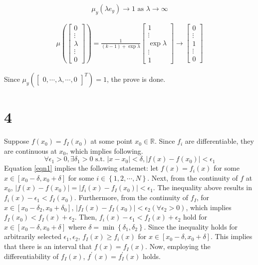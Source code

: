 \documentclass[10pt]{article}
\begin{document}
\begin{equation*}
    \mu_y(\lambda e_y) \rightarrow 1 \text{ as } \lambda \rightarrow \infty
\end{equation*}

\begin{align*}
    \mu\left(\begin{bmatrix}
        0  \\ \vdots \\ \lambda \\ \vdots \\ 0 
    \end{bmatrix}\right) = \frac{1}{(k-1) + \exp{\lambda}}\begin{bmatrix}
        1  \\ \vdots \\ \exp{\lambda} \\ \vdots \\ 1 
    \end{bmatrix} \rightarrow \begin{bmatrix}
        0  \\ \vdots \\ 1 \\ \vdots \\ 0
    \end{bmatrix}
\end{align*}

Since $\mu_y(\begin{bmatrix}
    0  ,\cdots,  \lambda,  \cdots,  0
\end{bmatrix}^T) = 1$, the prove is done.

\section*{4}
Suppose $f(x_0) = f_I(x_0)$ at some point $x_0 \in \mathbb{R}$. Since $f_i$ are differentiable, they are continuous at $x_0$, which implies following.
\begin{equation}
    \forall \epsilon_1>0, \exists \delta_1>0 \text{ s.t. } |x-x_0| < \delta, |f(x) - f(x_0)| <\epsilon_1
    \label{eqn1}
\end{equation}
Equation \ref{eqn1} implies the following statemet: let $f(x)=f_i(x)$ for some $x \in [x_0-\delta,x_0+\delta]$ for some $i \in \left\{1,2,\cdots,N\right\}$. Next, from the continuity of $f$ at $x_0$, $|f(x) - f(x_0)| = |f_i(x) - f_I(x_0)| < \epsilon_1$.
The inequality above results in $f_i(x)-\epsilon_1 < f_I(x_0)$. Furthermore, from the continuity of $f_I$, for $x \in [x_0 -\delta_2, x_0 + \delta_0]$, $ |f_I(x) - f_I(x_0)| <\epsilon_2(\forall \epsilon_2>0)$, which implies $f_I(x_0) < f_I(x) + \epsilon_2$.
Then, $f_i(x)-\epsilon_1<f_I(x)+\epsilon_2$ hold for $x \in [x_0 - \delta, x_0 + \delta]$ where $\delta = \min\left\{\delta_1,\delta_2\right\}$. Since the inequality holds for arbitrarily selected $\epsilon_1, \epsilon_2$, $f_I(x) \ge f_i(x)$ for $x \in [x_0 - \delta, x_0 + \delta]$.
This implies that there is an interval that $f(x) = f_I(x)$. Now, employing the differentiability of $f_I(x)$, $f^\prime(x) = f_I^\prime(x)$ holds.
\end{document}
